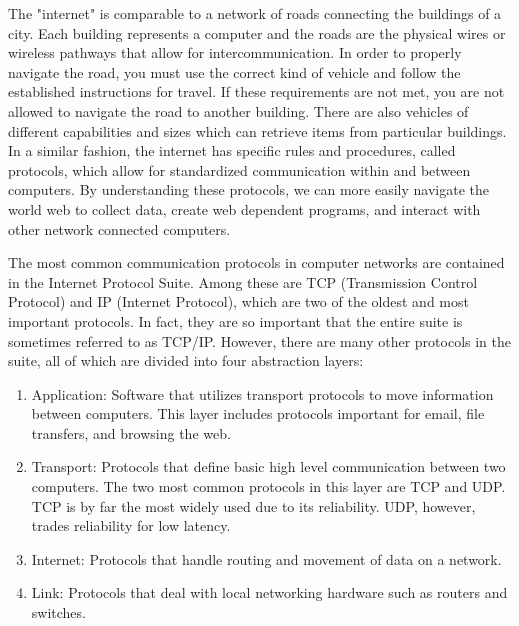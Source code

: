 
The "internet" is comparable to a network of roads connecting the buildings of a city. Each building represents a computer and the roads are the physical wires or wireless pathways that allow for intercommunication. In order to properly navigate the road, you must use the correct kind of vehicle and follow the established instructions for travel. If these requirements are not met, you are not allowed to navigate the road to another building. There are also vehicles of different capabilities and sizes which can retrieve items from particular buildings. In a similar fashion, the internet has specific rules and procedures, called protocols, which allow for standardized communication within and between computers. By understanding these protocols, we can more easily navigate the world web to collect data, create web dependent programs, and interact with other network connected computers.

The most common communication protocols in computer networks are contained in the Internet Protocol Suite. Among these are TCP (Transmission Control Protocol) and IP (Internet Protocol), which are two of the oldest and most important protocols. In fact, they are so important that the entire suite is sometimes referred to as TCP/IP. However, there are many other protocols in the suite, all of which are divided into four abstraction layers:
\begin{enumerate}
\item Application: Software that utilizes transport protocols to move information between computers.
This layer includes protocols important for email, file transfers, and browsing the web.
\item Transport: Protocols that define basic high level communication between two computers.
The two most common protocols in this layer are TCP and UDP.
TCP is by far the most widely used due to its reliability.
UDP, however, trades reliability for low latency.
\item Internet: Protocols that handle routing and movement of data on a network.
\item Link: Protocols that deal with local networking hardware such as routers and switches.
\end{enumerate}

